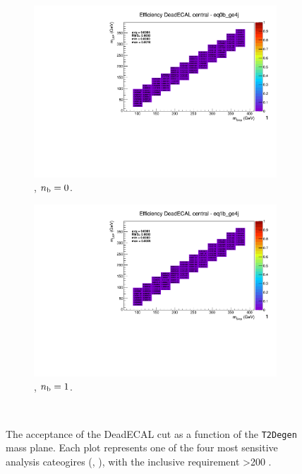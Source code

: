 \begin{figure}[h!]
\begin{subfigure}[b]{0.4\textwidth}
  \end{subfigure}\\
  \begin{subfigure}[b]{0.4\textwidth}
    \includegraphics[width=\textwidth, page=5]{Figs/sms/t2degen/v19_2/systs/T2_4body_DeadECAL_eq0b_ge4j.pdf}
    \caption{\njhigh, $n_{\text{b}} = 0$.}
  \end{subfigure}
  \begin{subfigure}[b]{0.4\textwidth}
    \includegraphics[width=\textwidth, page=5]{Figs/sms/t2degen/v19_2/systs/T2_4body_DeadECAL_eq1b_ge4j.pdf}
    \caption{\njhigh, $n_{\text{b}} = 1$.}
  \end{subfigure}\\
  \caption{The acceptance of the DeadECAL cut as a function of the \texttt{T2Degen}
  mass plane. Each plot represents one of the four most sensitive 
  analysis cateogires (\nb, \nj), with the inclusive requirement \HT>200 \gev.}
  \label{fig:sms-deadecal-t2degen}
\end{figure}

